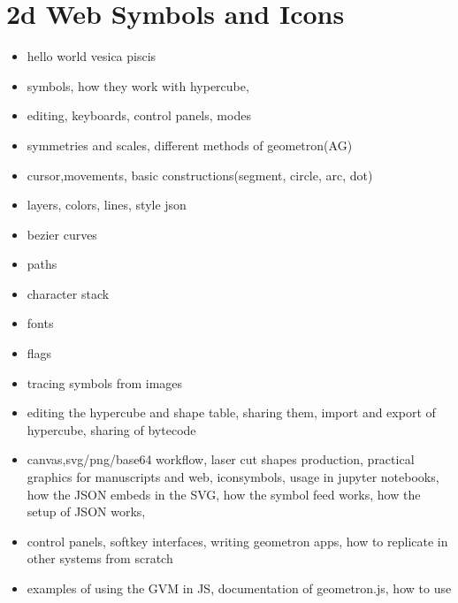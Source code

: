

\section{2d Web Symbols and Icons}

\begin{itemize}
\tightlist
\item
hello world vesica piscis
\item
symbols, how they work with hypercube, 
\item
editing, keyboards, control panels, modes
\item
symmetries and scales, different methods of geometron(AG)
\item
cursor,movements, basic constructions(segment, circle, arc, dot)
\item
layers, colors, lines, style json
\item
bezier curves
\item
paths
\item
character stack
\item
fonts
\item
flags
\item
tracing symbols from images
\item
editing the hypercube and shape table, sharing them, import and export of hypercube, sharing of bytecode
\item
canvas,svg/png/base64 workflow, laser cut shapes production, practical graphics for manuscripts and web, iconsymbols, usage in jupyter notebooks, how the JSON embeds in the SVG, how the symbol feed works, how the setup of JSON works,
\item
control panels, softkey interfaces, writing geometron apps, how to replicate in other systems from scratch
\item
examples of using the GVM in JS, documentation of geometron.js, how to use
\end{itemize}